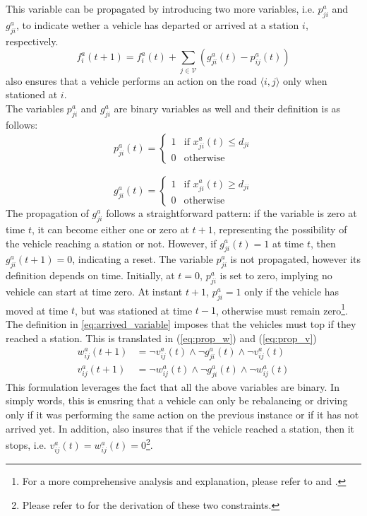 This variable can be propagated by introducing two more variables, i.e. $p^a_{ji}$ and $g^a_{ji}$, to indicate wether a vehicle has departed or arrived at a station $i$, respectively. 
\begin{equation}
		f^a_i(t+1) =f^a_i(t) + \sum_{j\in\mathcal{V}}(g^a_{ji}(t) - p_{ij}^a(t)) 
		\label{eq:stationed_propagation_ind}
\end{equation}
 also ensures that a vehicle performs an action on the road $\langle i,j\rangle$ only when stationed at $i$.\\
The variables $p^a_{ji}$ and $g^a_{ji}$ are binary variables as well and their definition is as follows:
\begin{align}
	p^a_{ji}(t) =\begin{cases}
		1 & \text{if }x^a_{ji}(t) \le d_{ji}\\
		0 & \text{otherwise}
	\end{cases}
	\label{eq:departed_variable}
\end{align}

\begin{equation}
	g^a_{ji}(t) =\begin{cases}
		1 & \text{if }x^a_{ji}(t) \ge d_{ji}\\
		0 & \text{otherwise}
	\end{cases}
	\label{eq:arrived_variable}
\end{equation}
The propagation of $g^a_{ji} $ follows a straightforward pattern: if the variable is zero at time $ t $, it can become either one or zero at $ t+1 $, representing the possibility of the vehicle reaching a station or not. However, if $ g^a_{ji}(t) = 1 $ at time $ t $, then $ g^a_{ji}(t+1) = 0 $, indicating a reset.  The variable $ p^a_{ji}$ is not propagated, however its definition depends on time. Initially, at $ t=0 $, $p^a_{ji} $ is set to zero, implying no vehicle can start at time zero. At instant $ t+1 $,  $p^a_{ji} = 1$ only if the vehicle has moved at time $t$, but was stationed at time $t-1$, otherwise must remain zero\footnote{For a more comprehensive analysis and explanation, please refer to  and . }. \\
The definition in \ref{eq:arrived_variable} imposes that the vehicles must top if they reached a station. This is translated  in  (\ref{eq:prop_w}) and (\ref{eq:prop_v})
\begin{align}
	w_{ij}^a(t+1) &= \neg v^a_{ij}(t) \land \neg g^a_{ji}(t) \land \neg v^a_{ij}(t)  \label{eq:prop_w}\\
	v_{ij}^a(t+1) &= \neg w^a_{ij}(t) \land \neg g^a_{ji}(t) \land \neg w^a_{ij}(t) \label{eq:prop_v}
\end{align}
This formulation leverages the fact that all the above variables are binary. In simply words, this is enusring that a vehicle can only be rebalancing or driving only if it was performing the same action on the previous instance or if it has not arrived yet. In addition, also insures that if the vehicle reached a station, then it stops, i.e. $v^a_{ij}(t)=w^a_{ij}(t)=0$\footnote{Please refer to  for the derivation of these two constraints.}. 

